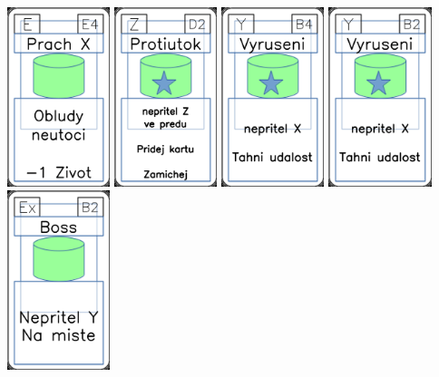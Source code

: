 \documentclass[a4paper]{article}
\begin{document}
	\includegraphics[width=3.0cm]{img-4_53}
	\includegraphics[width=3.0cm]{img-5_46}
	\includegraphics[width=3.0cm]{img-5_38}
	\includegraphics[width=3.0cm]{img-5_36}
	\includegraphics[width=3.0cm]{img-4_6}
\end{document}
